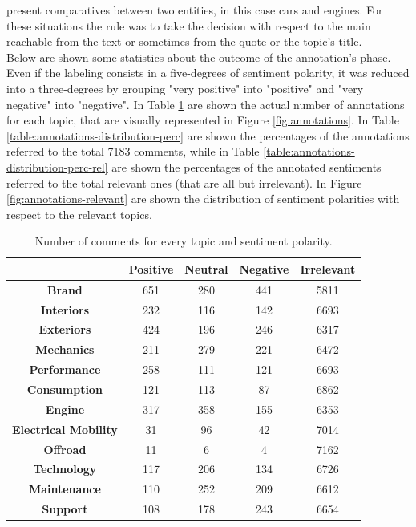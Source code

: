 present comparatives between two entities, in this case cars and engines. For these situations the rule was to take the decision with respect to the main reachable from the text or sometimes from the quote or the topic's title.\\

Below are shown some statistics about the outcome of the annotation's phase. Even if the labeling consists in a five-degrees of sentiment polarity, it was reduced into a three-degrees by grouping "very positive" into "positive" and "very negative" into "negative".
In Table \ref{table:annotations-distribution} are shown the actual number of annotations for each topic, that are visually represented in Figure \ref{fig:annotations}. In Table \ref{table:annotations-distribution-perc} are shown the percentages of the annotations referred to the total 7183 comments, while in Table \ref{table:annotations-distribution-perc-rel} are shown the percentages of the annotated sentiments referred to the total relevant ones (that are all but irrelevant). In Figure \ref{fig:annotations-relevant} are shown the distribution of sentiment polarities with respect to the relevant topics.


\begin{table}[ht]
	\renewcommand{\arraystretch}{1.5}
	\centering
	\begin{tabular}{| c | c | c | c | c |} 
		\hline
		& \textbf{Positive} & \textbf{Neutral} & \textbf{Negative} & \textbf{Irrelevant} \\ [.06cm]
		\hline
		\hline
		\textbf{Brand}& 651 & 280 & 441 & 5811 \\ [.06cm]
		\hline
		\textbf{Interiors}& 232 & 116 & 142 & 6693 \\ [.06cm]
		\hline
		\textbf{Exteriors}& 424 & 196 & 246 & 6317  \\ [.06cm]
		\hline
		\textbf{Mechanics}& 211 & 279 & 221 & 6472 \\ [.06cm]
		\hline
		\textbf{Performance}& 258 & 111 & 121 & 6693 \\ [.06cm]
		\hline
		\textbf{Consumption}& 121 & 113 & 87 & 6862 \\ [.06cm]
		\hline
		\textbf{Engine}& 317 & 358 & 155 & 6353 \\ [.06cm]
		\hline
		\textbf{Electrical Mobility}& 31 & 96 & 42 & 7014 \\ [.06cm]
		\hline
		\textbf{Offroad}& 11 & 6 & 4 & 7162 \\ [.06cm]
		\hline
		\textbf{Technology}& 117 & 206 & 134 & 6726 \\ [.06cm]
		\hline
		\textbf{Maintenance}& 110 & 252 & 209 & 6612 \\ [.06cm]
		\hline
		\textbf{Support}& 108 & 178 & 243 & 6654 \\ [.06cm]
		\hline
		
	\end{tabular}
	\caption{Number of comments for every topic and sentiment polarity.}
	\label{table:annotations-distribution}
\end{table}

